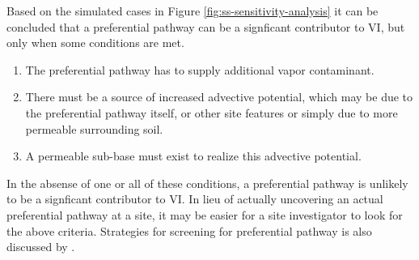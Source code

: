 \documentclass[journal=esthag,manuscript=article]{achemso}
\begin{document}
Based on the simulated cases in Figure \ref{fig:ss-sensitivity-analysis} it can be concluded that a preferential pathway can be a signficant contributor to VI, but only when some conditions are met.
\begin{enumerate}
  \item The preferential pathway has to supply additional vapor contaminant.
  \item There must be a source of increased advective potential, which may be due to the preferential pathway itself, or other site features or simply due to more permeable surrounding soil.
  \item A permeable sub-base must exist to realize this advective potential.
\end{enumerate}
In the absense of one or all of these conditions, a preferential pathway is unlikely to be a signficant contributor to VI.
In lieu of actually uncovering an actual preferential pathway at a site, it may be easier for a site investigator to look for the above criteria.
Strategies for screening for preferential pathway is also discussed by \citeauthor{nielsen_remediation_2017}\cite{nielsen_remediation_2017}. \par
\end{document}
